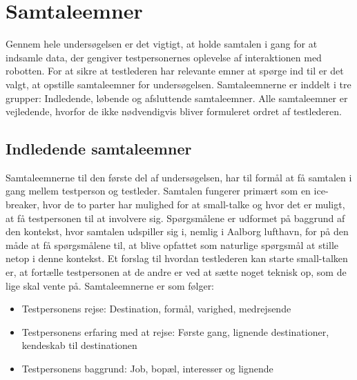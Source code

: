 \section{Samtaleemner}
\label{ParametreSamtaleemner}
%
Gennem hele undersøgelsen er det vigtigt, at holde samtalen i gang for at indsamle data, der gengiver testpersonernes oplevelse af interaktionen med robotten. For at sikre at testlederen har relevante emner at spørge ind til er det valgt, at opstille samtaleemner for undersøgelsen. Samtaleemnerne er inddelt i tre grupper: Indledende, løbende og afsluttende samtaleemner. Alle samtaleemner er vejledende, hvorfor de ikke nødvendigvis bliver formuleret ordret af testlederen.

\subsection{Indledende samtaleemner} 
\label{ParametreIndledendeSamtaleemner}
%
Samtaleemnerne til den første del af undersøgelsen, har til formål at få samtalen i gang mellem testperson og testleder. Samtalen fungerer primært som en ice-breaker, hvor de to parter har mulighed for at small-talke og hvor det er muligt, at få testpersonen til at involvere sig. Spørgsmålene er udformet på baggrund af den kontekst, hvor samtalen udspiller sig i, nemlig i Aalborg lufthavn, for på den måde at få spørgsmålene til, at blive opfattet som naturlige spørgsmål at stille netop i denne kontekst. Et forslag til hvordan testlederen kan starte small-talken er, at fortælle testpersonen at de andre er ved at sætte noget teknisk op, som de lige skal vente på. Samtaleemnerne er som følger:\blankline
%
\begin{itemize}
\item Testpersonens rejse: Destination, formål, varighed, medrejsende
\item Testpersonens erfaring med at rejse: Første gang, lignende destinationer, kendeskab til destinationen 
\item Testpersonens baggrund: Job, bopæl, interesser og lignende
\end{itemize}
%

